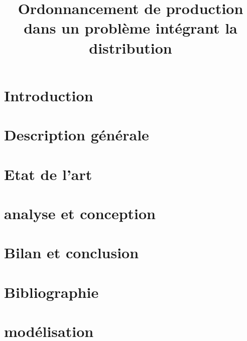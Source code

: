 \documentclass{polytech/polytech}
\title{Ordonnancement de production dans un problème intégrant la distribution}
\begin{document}
\part{Introduction}


\part{Description générale}


\part{Etat de l'art}


\part{analyse et conception}



\part{Bilan et conclusion}


\part{Bibliographie}

\appendix

\part{modélisation}

\end{document}
